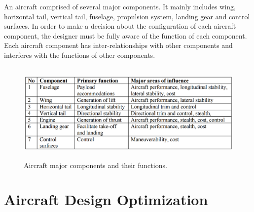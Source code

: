 An aircraft comprised of several major components. It mainly includes wing, horizontal tail, vertical tail, fuselage, propulsion system, landing gear and control surfaces. In order to make a decision about the configuration of each aircraft component, the designer must be fully aware of the function of each component. Each aircraft component has inter-relationships with other
components and interferes with the functions of other components. 

\begin{figure}[H]
\centering
\includegraphics[height=4.9cm]{Immagini/componentfunction}
\caption{Aircraft major components and their functions.\cite{aircraft}}
\label{comp}
\end{figure}

\section{Aircraft Design Optimization}

